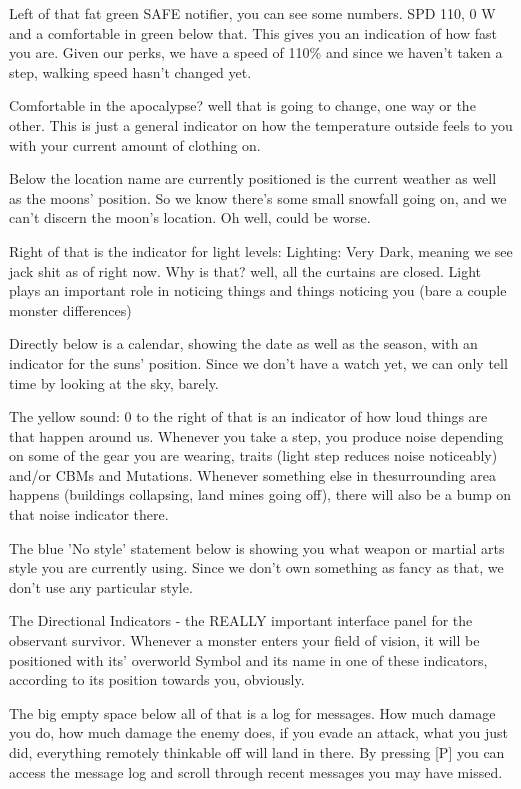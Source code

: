 Left of that fat green SAFE notifier, you can see some numbers. SPD 110, 0 W and a comfortable in green below that. This gives you an indication of how fast you are. Given our perks, we have a speed of 110\% and since we haven't taken a step, walking speed hasn't changed yet.

Comfortable in the apocalypse? well that is going to change, one way or the other. This is just a general indicator on how the temperature outside feels to you with your current amount of clothing on.

Below the location name are currently positioned is the current weather as well as the moons' position. So we know there's some small snowfall going on, and we can't discern the moon's location. Oh well, could be worse.

Right of that is the indicator for light levels: Lighting: Very Dark, meaning we see jack shit as of right now. Why is that? well, all the curtains are closed. Light plays an important role in noticing things and things noticing you (bare a couple monster differences)

Directly below is a calendar, showing the date as well as the season, with an indicator for the suns' position. Since we don't have a watch yet, we can only tell time by looking at the sky, barely.

The yellow sound: 0 to the right of that is an indicator of how loud things are that happen around us. Whenever you take a step, you produce noise depending on some of the gear you are wearing, traits (light step reduces noise noticeably) and/or CBMs and Mutations. Whenever something else in thesurrounding area happens (buildings collapsing, land mines going off), there will also be a bump on that noise indicator there.

The blue 'No style' statement below is showing you what weapon or martial arts style you are currently using. Since we don't own something as fancy as that, we don't use any particular style.

The Directional Indicators - the REALLY important interface panel for the observant survivor. Whenever a monster enters your field of vision, it will be positioned with its' overworld Symbol and its name in one of these indicators, according to its position towards you, obviously.

The big empty space below all of that is a log for messages. How much damage you do, how much damage the enemy does, if you evade an attack, what you just did, everything remotely thinkable off will land in there. By pressing [P] you can access the message log and scroll through recent messages you may have missed.

